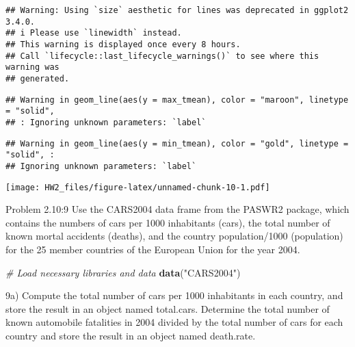 \documentclass[
]{article}
\newenvironment{Shaded}{\begin{snugshade}}{\end{snugshade}}
\newcommand{\AttributeTok}[1]{\textcolor[rgb]{0.13,0.29,0.53}{#1}}
\newcommand{\CommentTok}[1]{\textcolor[rgb]{0.56,0.35,0.01}{\textit{#1}}}
\newcommand{\FunctionTok}[1]{\textcolor[rgb]{0.13,0.29,0.53}{\textbf{#1}}}
\newcommand{\NormalTok}[1]{#1}
\newcommand{\OtherTok}[1]{\textcolor[rgb]{0.56,0.35,0.01}{#1}}
\newcommand{\SpecialCharTok}[1]{\textcolor[rgb]{0.81,0.36,0.00}{\textbf{#1}}}
\newcommand{\StringTok}[1]{\textcolor[rgb]{0.31,0.60,0.02}{#1}}
\begin{document}
\begin{verbatim}
## Warning: Using `size` aesthetic for lines was deprecated in ggplot2 3.4.0.
## i Please use `linewidth` instead.
## This warning is displayed once every 8 hours.
## Call `lifecycle::last_lifecycle_warnings()` to see where this warning was
## generated.
\end{verbatim}

\begin{verbatim}
## Warning in geom_line(aes(y = max_tmean), color = "maroon", linetype = "solid",
## : Ignoring unknown parameters: `label`
\end{verbatim}

\begin{verbatim}
## Warning in geom_line(aes(y = min_tmean), color = "gold", linetype = "solid", :
## Ignoring unknown parameters: `label`
\end{verbatim}

\texttt{[image: HW2\_files/figure-latex/unnamed-chunk-10-1.pdf]}

Problem 2.10:9 Use the CARS2004 data frame from the PASWR2 package,
which contains the numbers of cars per 1000 inhabitants (cars), the
total number of known mortal accidents (deaths), and the country
population/1000 (population) for the 25 member countries of the European
Union for the year 2004.

\begin{Shaded}
\begin{Highlighting}[]
\CommentTok{\# Load necessary libraries and data}
\FunctionTok{data}\NormalTok{(}\StringTok{"CARS2004"}\NormalTok{)}
\end{Highlighting}
\end{Shaded}

9a) Compute the total number of cars per 1000 inhabitants in each
country, and store the result in an object named total.cars. Determine
the total number of known automobile fatalities in 2004 divided by the
total number of cars for each country and store the result in an object
named death.rate.

\begin{Shaded}
\end{Shaded}
\end{document}
